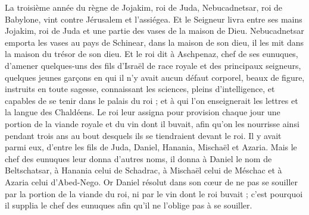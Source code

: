 \begin{multicols}{2}
\VerseOne{}La troisième année du règne de Jojakim, roi de Juda, Nebucadnetsar, roi de Babylone, vint contre Jérusalem et l'assiégea.
Et le Seigneur livra entre ses mains Jojakim, roi de Juda et une partie des vases de la maison de Dieu. Nebucadnetsar emporta les vases au pays de Schinear, dans la maison de son dieu, il les mit dans la maison du trésor de son dieu.
Et le roi dit à Aschpenaz, chef de ses eunuques, d'amener quelques-uns des fils d'Israël de race royale et des principaux seigneurs,
quelques jeunes garçons en qui il n'y avait aucun défaut corporel, beaux de figure, instruits en toute sagesse, connaissant les sciences, pleins d'intelligence, et capables de se tenir dans le palais du roi ; et à qui l'on enseignerait les lettres et la langue des Chaldéens.
Le roi leur assigna pour provision chaque jour une portion de la viande royale et du vin dont il buvait, afin qu'on les nourrisse ainsi pendant trois ans au bout desquels ils se tiendraient devant le roi.
Il y avait parmi eux, d'entre les fils de Juda, Daniel, Hanania, Mischaël et Azaria.
Mais le chef des eunuques leur donna d'autres noms, il donna à Daniel le nom de Beltschatsar, à Hanania celui de Schadrac, à Mischaël celui de Méschac et à Azaria celui d'Abed-Nego.
Or Daniel résolut dans son cœur de ne pas se souiller par la portion de la viande du roi, ni par le vin dont le roi buvait ; c'est pourquoi il supplia le chef des eunuques afin qu'il ne l'oblige pas à se souiller.

\end{multicols}
